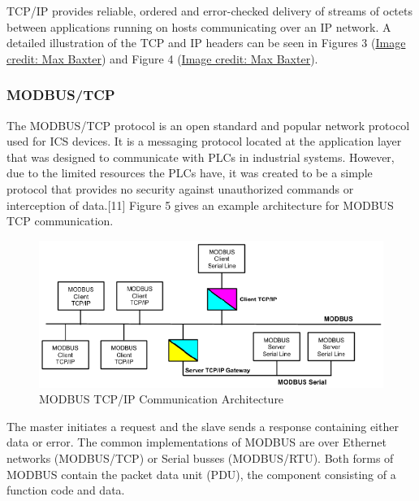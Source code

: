 \documentclass[11pt,]{article}
\begin{document}
\clearpage

TCP/IP provides reliable, ordered and error-checked delivery of streams
of octets between applications running on hosts communicating over an IP
network. A detailed illustration of the TCP and IP headers can be seen
in Figures 3
(\href{http://nmap.org/book/images/hdr/MJB-TCP-Header}{Image credit: Max
Baxter}) and Figure 4
(\href{http://nmap.org/book/images/hdr/MJB-IP-Header}{Image credit: Max
Baxter}).

\subsubsection{MODBUS/TCP}\label{modbustcp}

The MODBUS/TCP protocol is an open standard and popular network protocol
used for ICS devices. It is a messaging protocol located at the
application layer that was designed to communicate with PLCs in
industrial systems. However, due to the limited resources the PLCs have,
it was created to be a simple protocol that provides no security against
unauthorized commands or interception of data.{[}11{]} Figure 5 gives an
example architecture for MODBUS TCP communication.

\begin{figure}[middle]

{\centering \includegraphics{thesis_files/figure-latex/unnamed-chunk-8-1} 

}

\caption{MODBUS TCP/IP Communication Architecture}\label{fig:unnamed-chunk-8}
\end{figure}

The master initiates a request and the slave sends a response containing
either data or error. The common implementations of MODBUS are over
Ethernet networks (MODBUS/TCP) or Serial busses (MODBUS/RTU). Both forms
of MODBUS contain the packet data unit (PDU), the component consisting
of a function code and data.
\end{document}
